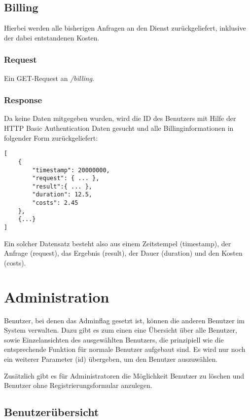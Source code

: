 \documentclass[ngerman,titlepage]{scrartcl}
\begin{document}
	\subsection{Billing}
	
	Hierbei werden alle bisherigen Anfragen an den Dienst zurückgeliefert, inklusive der dabei entstandenen Kosten.
	
		\subsubsection*{Request}
		
		Ein GET-Request an \textit{/billing}.
		
		\subsubsection*{Response}
		
		Da keine Daten mitgegeben wurden, wird die ID des Benutzers mit Hilfe der HTTP Basic Authentication Daten gesucht und alle Billinginformationen in folgender Form zurückgeliefert:
		
		\begin{lstlisting}
[
	{
		"timestamp": 20000000,
		"request": { ... },
		"result":{ ... },
		"duration": 12.5,
		"costs": 2.45
	},
	{...}
]
		\end{lstlisting}
		
		Ein solcher Datensatz besteht also aus einem Zeitstempel (timestamp), der Anfrage (request), das Ergebnis (result), der Dauer (duration) und den Kosten (costs).
	

\section{Administration}

Benutzer, bei denen das Adminflag gesetzt ist, können die anderen Benutzer im System verwalten. 
Dazu gibt es zum einen eine Übersicht über alle Benutzer, sowie Einzelansichten des ausgewählten Benutzers, die prinzipiell wie die entsprechende Funktion für normale Benutzer aufgebaut sind.
Es wird nur noch ein weiterer Parameter (id) übergeben, um den Benutzer auszuwählen.

Zusätzlich gibt es für Administratoren die Möglichkeit Benutzer zu löschen und Benutzer ohne Registrierungsformular anzulegen.

	\subsection{Benutzerübersicht}
	
\end{document}
